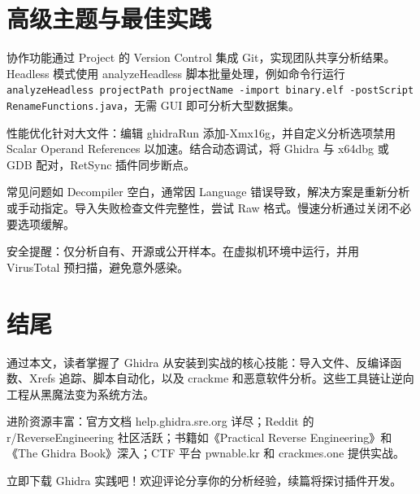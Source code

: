 \chapter{高级主题与最佳实践}
协作功能通过 Project 的 Version Control 集成 Git，实现团队共享分析结果。Headless 模式使用 analyzeHeadless 脚本批量处理，例如命令行运行 \texttt{analyzeHeadless projectPath projectName -import binary.elf -postScript RenameFunctions.java}，无需 GUI 即可分析大型数据集。\par
性能优化针对大文件：编辑 ghidraRun 添加-Xmx16g，并自定义分析选项禁用 Scalar Operand References 以加速。结合动态调试，将 Ghidra 与 x64dbg 或 GDB 配对，RetSync 插件同步断点。\par
常见问题如 Decompiler 空白，通常因 Language 错误导致，解决方案是重新分析或手动指定。导入失败检查文件完整性，尝试 Raw 格式。慢速分析通过关闭不必要选项缓解。\par
安全提醒：仅分析自有、开源或公开样本。在虚拟机环境中运行，并用 VirusTotal 预扫描，避免意外感染。\par
\chapter{结尾}
通过本文，读者掌握了 Ghidra 从安装到实战的核心技能：导入文件、反编译函数、Xrefs 追踪、脚本自动化，以及 crackme 和恶意软件分析。这些工具链让逆向工程从黑魔法变为系统方法。\par
进阶资源丰富：官方文档 help.ghidra.sre.org 详尽；Reddit 的 r/ReverseEngineering 社区活跃；书籍如《Practical Reverse Engineering》和《The Ghidra Book》深入；CTF 平台 pwnable.kr 和 crackmes.one 提供实战。\par
立即下载 Ghidra 实践吧！欢迎评论分享你的分析经验，续篇将探讨插件开发。\par
